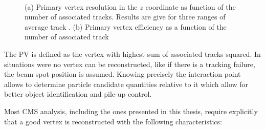 \begin{figure}[htp]%
\centering
{}\qquad
{}\\
\caption[Primary vertex resolution in the $z$ coordinate and vertex reconstruction efficiency as a function of the number of constituent tracks.]{(a) Primary vertex resolution in the $z$ coordinate as function of the number of associated tracks. Results are give for three ranges of average track \pt. (b) Primary vertex efficiency as a function of the number of associated track \cite{ARTICLE:CMSTrackingAndPrimaryVertex}}
\label{FIGURE:EventReconstructionAndSimulation_Vertex}
\end{figure}

The \gls{PV} is defined as the vertex with highest sum of associated tracks \pt squared. In situations were no vertex can be reconstructed, like if there is a tracking failure, the beam spot position is assumed. Knowing precisely the interaction point allows to determine particle candidate quantities relative to it which allow for better object identification and pile-up control. 

Most \gls{CMS} analysis, including the ones presented in this thesis, require explicitly that a good vertex is reconstructed with the following characteristics:

